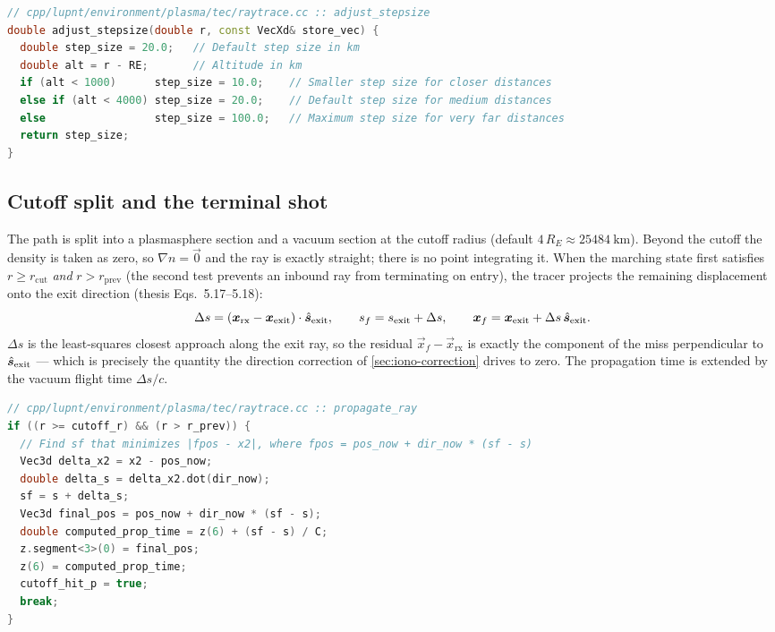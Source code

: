 \begin{lstlisting}[language=cpp, caption={Altitude-keyed step schedule.  Source:
\texttt{cpp/lupnt/environment/plasma/tec/raytrace.cc} ::
\code{adjust\_stepsize}.}, label={lst:iono-step}]
// cpp/lupnt/environment/plasma/tec/raytrace.cc :: adjust_stepsize
double adjust_stepsize(double r, const VecXd& store_vec) {
  double step_size = 20.0;   // Default step size in km
  double alt = r - RE;       // Altitude in km
  if (alt < 1000)      step_size = 10.0;    // Smaller step size for closer distances
  else if (alt < 4000) step_size = 20.0;    // Default step size for medium distances
  else                 step_size = 100.0;   // Maximum step size for very far distances
  return step_size;
}
\end{lstlisting}

\subsection{Cutoff split and the terminal shot}
\label{sec:iono-cutoff}

The path is split into a plasmasphere section and a vacuum section at the cutoff
radius  (default
$4\,R_E \approx \SI{25484}{\kilo\meter}$).  Beyond the cutoff the density is
taken as zero, so $\nabla n = \vec{0}$ and the ray is exactly straight; there is
no point integrating it.  When the marching state first satisfies
$r \ge r_\mathrm{cut}$ \emph{and} $r > r_\mathrm{prev}$ (the second test prevents
an inbound ray from terminating on entry), the tracer projects the remaining
displacement onto the exit direction (thesis Eqs.~5.17--5.18):
%
\begin{equation}
  \label{eq:iono-shoot}
  \Delta s = \left(\bm{x}_\mathrm{rx} - \bm{x}_\mathrm{exit}\right)\cdot\hat{\bm{s}}_\mathrm{exit},
  \qquad
  s_f = s_\mathrm{exit} + \Delta s,
  \qquad
  \bm{x}_f = \bm{x}_\mathrm{exit} + \Delta s\,\hat{\bm{s}}_\mathrm{exit} .
\end{equation}
%
$\Delta s$ is the least-squares closest approach along the exit ray, so the
residual $\vec{x}_f - \vec{x}_\mathrm{rx}$ is exactly the component of the miss
perpendicular to $\hat{\bm{s}}_\mathrm{exit}$ --- which is precisely the quantity the
direction correction of \cref{sec:iono-correction} drives to zero.  The
propagation time is extended by the vacuum flight time $\Delta s / c$.

\begin{lstlisting}[language=cpp, caption={Cutoff exit and terminal shot.  Source:
\texttt{cpp/lupnt/environment/plasma/tec/raytrace.cc} ::
\code{propagate\_ray}.}, label={lst:iono-shoot}]
// cpp/lupnt/environment/plasma/tec/raytrace.cc :: propagate_ray
if ((r >= cutoff_r) && (r > r_prev)) {
  // Find sf that minimizes |fpos - x2|, where fpos = pos_now + dir_now * (sf - s)
  Vec3d delta_x2 = x2 - pos_now;
  double delta_s = delta_x2.dot(dir_now);
  sf = s + delta_s;
  Vec3d final_pos = pos_now + dir_now * (sf - s);
  double computed_prop_time = z(6) + (sf - s) / C;
  z.segment<3>(0) = final_pos;
  z(6) = computed_prop_time;
  cutoff_hit_p = true;
  break;
}
\end{lstlisting}

